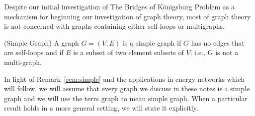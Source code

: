 %
%
\begin{remark}\label{rem:simple}
Despite our initial investigation of The Bridges of Königsburg Problem as a mechanism for beginning our investigation of graph theory, most of graph theory is not concerned with graphs containing either self-loops or multigraphs.
\end{remark}
%
\begin{definition}{(Simple Graph)}
A graph \(G = (V,E)\) is a simple graph if \(G\) has no edges that are self-loops and if \(E\) is a subset of two element subsets of \(V\); i.e., G is not a multi-graph.
\end{definition}
%
\begin{remark}
In light of Remark~\ref{rem:simple} and the applications in energy networks which will follow, we will assume that every graph we discuss in these notes is a simple graph and we will use the term graph to mean simple graph.
When a particular result holds in a more general setting, we will state it explicitly.
\end{remark}

